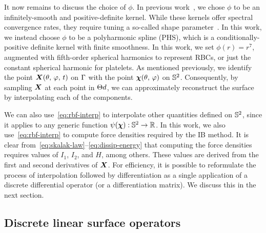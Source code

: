 It now remains to discuss the choice of $\phi$. In previous work~\cite{Shankar:2015km},
we chose $\phi$ to be an infinitely-smooth and positive-definite kernel. While these
kernels offer spectral convergence rates, they require tuning a so-called shape
parameter~\cite{Fasshauer:2007ui}. In this work, we instead choose $\phi$ to be a
polyharmonic spline (PHS), which is a conditionally-positive definite kernel with finite
smoothness. In this work, we set $\phi(r) = r^7$, augmented with fifth-order spherical
harmonics to represent RBCs, or just the constant spherical harmonic for platelets. As
mentioned previously, we identify the point $\boldsymbol{X}(\theta,\,\varphi,\,t)$ on $\Gamma$
with the point $\boldsymbol{\chi}(\theta,\,\varphi)$ on $\mathbb{S}^2$. Consequently, by sampling $\boldsymbol{X}$ at
each point in $\data\sites$, we can approximately reconstruct the surface by
interpolating each of the components. 

We can also use~\eqref{eq:rbf-interp} to interpolate other quantities defined on
$\mathbb{S}^2$, since it applies to any generic function $\psi(\boldsymbol{\chi}): \mathbb{S}^2 \to \mathbb{R}$.
In this work, we also use~\eqref{eq:rbf-interp} to compute force densities required by
the IB method. It is clear from~\eqref{eq:skalak-law}--\eqref{eq:dissip-energy} that
computing the force densities requires values of $I_1$, $I_2$, and $H$, among others.
These values are derived from the first and second derivatives of $\boldsymbol{X}$. For efficiency,
it is possible to reformulate the process of interpolation followed by differentiation as
a single application of a discrete differential operator (or a differentiation matrix).
We discuss this in the next section.

\subsection{Discrete linear surface operators}

